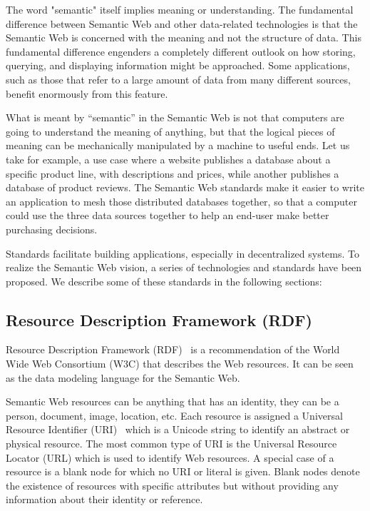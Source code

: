 The word "semantic" itself implies meaning or understanding. The fundamental difference between Semantic Web and other data-related technologies is that the Semantic Web is concerned with the meaning and not the structure of data. This fundamental difference engenders a completely different outlook on how storing, querying, and displaying information might be approached.  Some applications, such as those that refer to a large amount of data from many different sources, benefit enormously from this feature.

What is meant by ``semantic'' in the Semantic Web is not that computers are going to understand the meaning of anything, but that the logical pieces of meaning can be mechanically manipulated by a machine to useful ends. Let us take for example, a use case where a website publishes a database about a specific product line, with descriptions and prices, while another publishes a database of product reviews. The Semantic Web standards make it easier to write an application to mesh those distributed databases together, so that a computer could use the three data sources together to help an end-user make better purchasing decisions.

Standards facilitate building applications, especially in decentralized systems. To realize the Semantic Web vision, a series of technologies and standards have been proposed. We describe some of these standards in the following sections:

\subsection{Resource Description Framework (RDF)}
Resource Description Framework (RDF)~\cite{Lassila:RDF:99} is a recommendation of the World Wide Web Consortium (W3C) that describes the Web resources. It can be seen as the data modeling language for the Semantic Web.

Semantic Web resources can be anything that has an identity, they can be a person, document, image, location, etc. Each resource is assigned a Universal Resource Identifier (URI)~\cite{Berners:RFC:05} which is a Unicode string to identify an abstract or physical resource. The most common type of URI is the Universal Resource Locator (URL) which is used to identify Web resources. A special case of a resource is a blank node for which no URI or literal is given. Blank nodes denote the existence of resources with specific attributes but without providing any information about their identity or reference.

